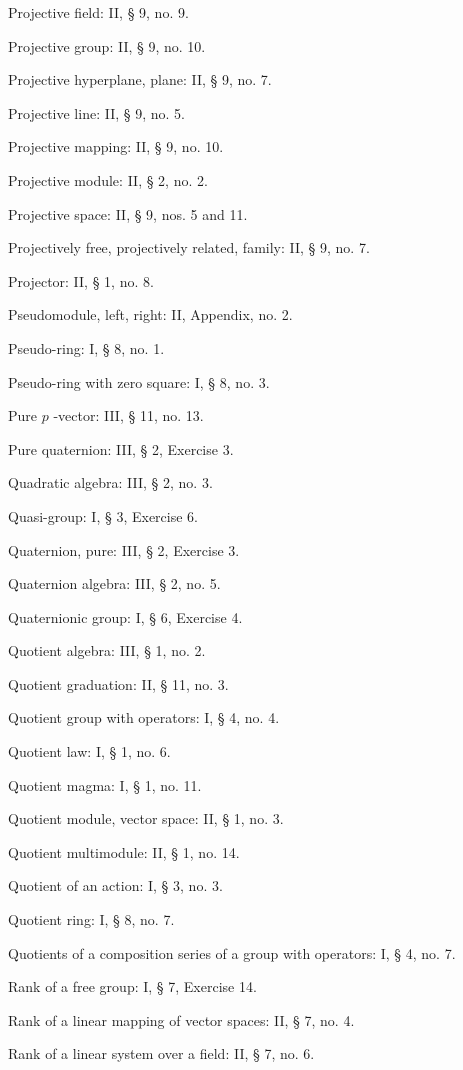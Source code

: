 Projective field: II, § 9, no. 9.

Projective group: II, § 9, no. 10.

Projective hyperplane, plane: II, § 9, no. 7.

Projective line: II, § 9, no. 5.

Projective mapping: II, § 9, no. 10.

Projective module: II, § 2, no. 2.

Projective space: II, § 9, nos. 5 and 11.

Projectively free, projectively related, family: II, § 9, no. 7.

Projector: II, § 1, no. 8.

Pseudomodule, left, right: II, Appendix, no. 2.

Pseudo-ring: I, § 8, no. 1.

Pseudo-ring with zero square: I, § 8, no. 3.

Pure \(p\) -vector: III, § 11, no. 13.

Pure quaternion: III, § 2, Exercise 3.

Quadratic algebra: III, § 2, no. 3.

Quasi-group: I, § 3, Exercise 6.

Quaternion, pure: III, § 2, Exercise 3.

Quaternion algebra: III, § 2, no. 5.

Quaternionic group: I, § 6, Exercise 4.

Quotient algebra: III, § 1, no. 2.

Quotient graduation: II, § 11, no. 3.

Quotient group with operators: I, § 4, no. 4.

Quotient law: I, § 1, no. 6.

Quotient magma: I, § 1, no. 11.

Quotient module, vector space: II, § 1, no. 3.

Quotient multimodule: II, § 1, no. 14.

Quotient of an action: I, § 3, no. 3.

Quotient ring: I, § 8, no. 7.

Quotients of a composition series of a group with operators: I, § 4, no. 7.

Rank of a free group: I, § 7, Exercise 14.

Rank of a linear mapping of vector spaces: II, § 7, no. 4.

Rank of a linear system over a field: II, § 7, no. 6.

